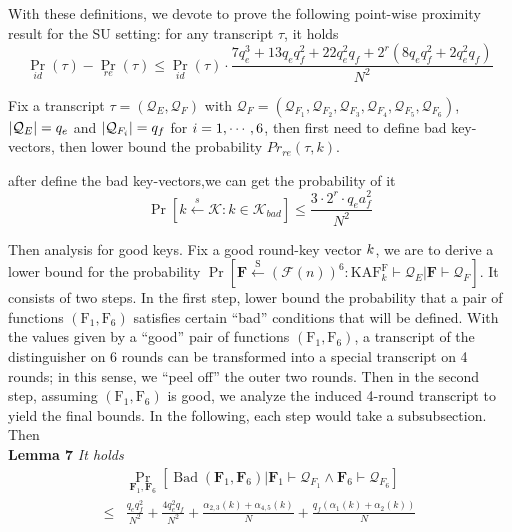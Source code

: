 With these definitions, we devote to prove the following point-wise proximity result for the SU setting: for any transcript $\tau$, it holds
$$
\operatorname{Pr}_{i d}(\tau)-\operatorname{Pr}_{r e}(\tau) \leq \operatorname{Pr}_{i d}(\tau) \cdot \frac{7 q_{e}^{3}+13 q_{e} q_{f}^{2}+22 q_{e}^{2} q_{f}+2^{r}\left(8 q_{e} q_{f}^{2}+2 q_{e}^{2} q_{f}\right)}{N^{2}}
$$

Fix a transcript $\tau = (\mathcal{Q}_E, \mathcal{Q}_F)$ with $\mathcal{Q}_F = (\mathcal{Q}_{F_1}, \mathcal{Q}_{F_2}, \mathcal{Q}_{F_3}, \mathcal{Q}_{F_4}, \mathcal{Q}_{F_5}, \mathcal{Q}_{F_6})$, $\left|\mathcal{Q}_E \right| = \mathnormal{q}_\mathnormal{e}$ and $\left|\mathcal{Q}_{F_i} \right| = \mathnormal{q}_\mathnormal{f}$ for $\mathnormal{i} = 1, \cdots, 6$, then first need to define bad key-vectors, then lower bound the probability $Pr_{re}(\tau, k)$.

after define the bad key-vectors,we can get the probability of it
$$
\operatorname{Pr}\left[k \stackrel{s}{\leftarrow} \mathcal{K}: k \in \mathcal{K}_{b a d}\right] \leq \frac{3 \cdot 2^{r} \cdot q_{e} a_{f}^{2}}{N^{2}}
$$

Then analysis for good keys. Fix a good round-key vector $\mathnormal{k}$, we are to derive a lower bound for the probability $\operatorname{Pr}\left[\mathbf{F} \stackrel{\mathrm{S}}{\leftarrow}(\mathcal{F}(n))^{6}: \mathrm{K} \mathrm{AF}_{k}^{\mathrm{F}} \vdash \mathcal{Q}_{E} | \mathbf{F} \vdash \mathcal{Q}_{F}\right]$. It consists of two steps. In the first step, lower bound the probability that a pair of functions  $(\mathrm{F}_1, \mathrm{F}_6)$ satisfies certain ``bad'' conditions that will be defined. With the values given by a ``good'' pair of functions $(\mathrm{F}_1, \mathrm{F}_6)$, a transcript of the distinguisher on 6 rounds can be transformed into a special transcript on 4 rounds; in this sense, we ``peel off'' the outer two rounds. Then in the second step, assuming $(\mathrm{F}_1, \mathrm{F}_6)$ is good, we analyze the induced 4-round transcript to yield the final bounds. In the following, each step would take a subsubsection. \\

\noindent Then\\

\noindent \textbf{Lemma 7} \emph{ It holds}
$$
\begin{aligned}
& \operatorname{Pr}_{\mathbf{F}_{1}, \mathbf{F}_{6}}\left[\operatorname{Bad}\left(\mathbf{F}_{1}, \mathbf{F}_{6}\right) | \mathbf{F}_{1} \vdash \mathcal{Q}_{F_{1}} \wedge \mathbf{F}_{6} \vdash \mathcal{Q}_{F_{6}}\right] \\
\leq & \frac{q_{e} q_{f}^{2}}{N^{2}}+\frac{4 q_{e}^{2} q_{f}}{N^{2}}+\frac{\alpha_{2,3}(k)+\alpha_{4,5}(k)}{N}+\frac{q_{f}\left(\alpha_{1}(k)+\alpha_{2}(k)\right)}{N}
\end{aligned}
$$

